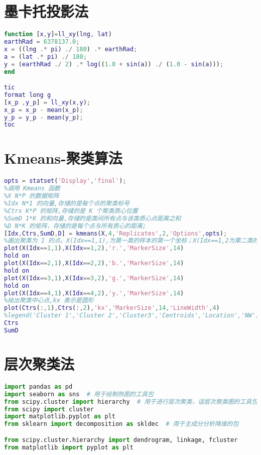\documentclass[withoutpreface,bwprint]{cumcmthesis} %
\begin{document}
\newpage
\begin{appendices}
\section{墨卡托投影法}
\begin{lstlisting}[language=matlab]
function [x,y]=ll_xy(lng, lat)
earthRad = 6378137.0;
x = ((lng .* pi) ./ 180) .* earthRad;
a = (lat .* pi) ./ 180;
y = (earthRad ./ 2) .* log((1.0 + sin(a)) ./ (1.0 - sin(a)));
end

tic
format long g
[x_p ,y_p] = ll_xy(x,y);
x_p = x_p - mean(x_p);
y_p = y_p - mean(y_p);
toc
 \end{lstlisting}
 
 \section{Kmeans-聚类算法}
\begin{lstlisting}[language=matlab]
opts = statset('Display','final');
%调用 Kmeans 函数
%X N*P 的数据矩阵
%Idx N*1 的向量,存储的是每个点的聚类标号
%Ctrs K*P 的矩阵,存储的是 K 个聚类质心位置
%SumD 1*K 的和向量,存储的是类间所有点与该类质心点距离之和
%D N*K 的矩阵，存储的是每个点与所有质心的距离;
[Idx,Ctrs,SumD,D] = kmeans(X,4,'Replicates',2,'Options',opts);
%画出聚类为 1 的点。X(Idx==1,1),为第一类的样本的第一个坐标；X(Idx==1,2为第二类的样本的第二个坐标
plot(X(Idx==1,1),X(Idx==1,2),'r.','MarkerSize',14)
hold on
plot(X(Idx==2,1),X(Idx==2,2),'b.','MarkerSize',14)
hold on
plot(X(Idx==3,1),X(Idx==3,2),'g.','MarkerSize',14)
hold on 
plot(X(Idx==4,1),X(Idx==4,2),'y.','MarkerSize',14)
%绘出聚类中心点,kx 表示是圆形
plot(Ctrs(:,1),Ctrs(:,2),'kx','MarkerSize',14,'LineWidth',4)
%legend('Cluster 1','Cluster 2','Cluster3','Centroids','Location','NW')
Ctrs
SumD
 \end{lstlisting}
 
 \section{层次聚类法}
 \begin{lstlisting}[language=python]
import pandas as pd
import seaborn as sns  # 用于绘制热图的工具包
from scipy.cluster import hierarchy  # 用于进行层次聚类，话层次聚类图的工具包
from scipy import cluster
import matplotlib.pyplot as plt
from sklearn import decomposition as skldec  # 用于主成分分析降维的包

from scipy.cluster.hierarchy import dendrogram, linkage, fcluster
from matplotlib import pyplot as plt


\end{lstlisting}
\end{appendices}
\end{document}

